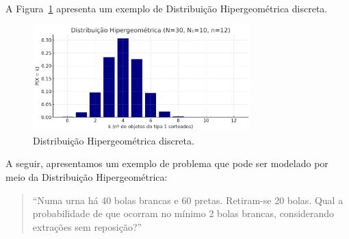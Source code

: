 \documentclass{article}
\begin{document}
A Figura~\ref{fig:dist_disc_hipergeometrica} apresenta um exemplo de Distribuição Hipergeométrica discreta.

\begin{figure}[H]
    \centering
    \includegraphics[width=0.75\textwidth]{figuras/dist_disc_hipergeometrica.png}
    \caption{Distribuição Hipergeométrica discreta.}
    \label{fig:dist_disc_hipergeometrica}
\end{figure}

A seguir, apresentamos um exemplo de problema que pode ser modelado por meio da Distribuição Hipergeométrica:
\begin{quote}
``Numa urna há 40 bolas brancas e 60 pretas. Retiram-se 20 bolas. Qual a probabilidade de que ocorram no mínimo 2 bolas brancas, considerando extrações sem reposição?''
\end{quote}
\end{document}
